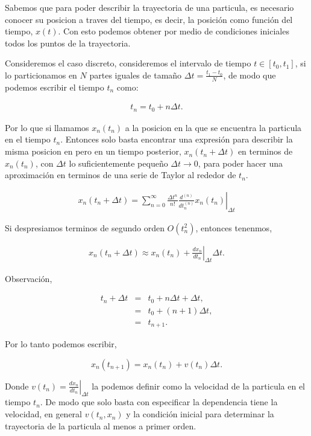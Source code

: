 \documentclass[a4paper,10p]{article}
\begin{document}
Sabemos que para poder describir la trayectoria de una particula, es necesario conocer su posicion a traves del tiempo, es decir, la posición como función del tiempo, $x(t)$. Con esto podemos obtener por medio de condiciones iniciales todos los puntos de la trayectoria. 
\newline

Consideremos el caso discreto, consideremos el intervalo de tiempo $t \in [t_0,t_1]$, si lo particionamos en $N$ partes iguales de tamaño $\Delta t = \frac{t_1-t_0}{N}$, de modo que   podemos escribir el tiempo $t_n$ como:

\begin{eqnarray*}
    t_n = t_0 + n\Delta t.    
\end{eqnarray*}

Por lo que si llamamos $x_n(t_n)$ a la posicion en la que se encuentra la particula en el tiempo $t_n$. Entonces solo basta encontrar una expresión para describir la misma posicion en pero en un tiempo posterior, $x_n(t_n + \Delta t)$ en terminos de $x_n(t_n)$, con $\Delta t$ lo suficientemente pequeño $\Delta t \rightarrow 0$, para poder hacer una aproximación en terminos de una serie de Taylor al rededor de $t_n$.
\newline

\begin{eqnarray*}
x_n(t_n + \Delta t) = \sum_{n=0}^{\infty} \frac{\Delta t^n}{n!} \left. \frac{d^{(n)} }{d t_n^{(n)}}  x_n(t_n) \right|_{\Delta t}    
\end{eqnarray*}

Si despresiamos terminos de segundo orden $O(t_n^2)$, entonces tenenmos,

\begin{eqnarray*}
    x_n(t_n + \Delta t) \approx x_n(t_n) +  \left. \frac{d x_n}{d t_n} \right|_{\Delta t} \Delta t.
\end{eqnarray*}
    
Observación,

\begin{eqnarray*}
    t_n + \Delta t &=& t_0 + n\Delta t + \Delta t,\\
                   &=& t_0 + (n+1)\Delta t,\\
                   &=& t_{n+1}.
\end{eqnarray*}

Por lo tanto podemos escribir,

\begin{equation}
    x_n(t_{n+1}) = x_n(t_n) +  v(t_n) \Delta t.
\end{equation}

Donde $v(t_n) = \left. \frac{d x_n}{d t_n} \right|_{\Delta t}$ la podemos definir como la velocidad de la particula en el tiempo $t_n$. De modo que solo basta con especificar la dependencia tiene la velocidad, en general $v(t_n,x_n)$ y la condición inicial para determinar la trayectoria de la particula al menos a primer orden.

















   
\end{document}
